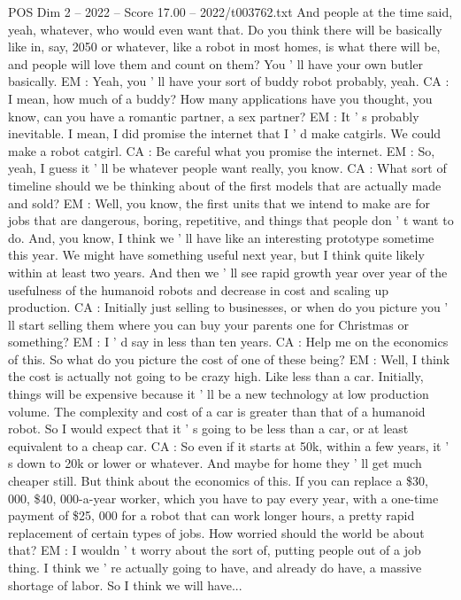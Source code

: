 \begin{textsample}{POS Dim 2 – 2022 – Score 17.00 – 2022/t003762.txt}
And people at the time said, yeah, whatever, who would even want that.
Do you think there will be basically like in, say, 2050 or whatever, like a robot in most homes, is what there will be, and people will love them and count on them?
You ' ll have your own butler basically.
EM : Yeah, you ' ll have your sort of buddy robot probably, yeah.
CA : I mean, how much of a buddy?
How many applications have you thought, you know, can you have a romantic partner, a sex partner?
EM : It ' s probably inevitable.
I mean, I did promise the internet that I ' d make catgirls.
We could make a robot catgirl.
CA : Be careful what you promise the internet.
EM : So, yeah, I guess it ' ll be whatever people want really, you know.
CA : What sort of timeline should we be thinking about of the first models that are actually made and sold?
EM : Well, you know, the first units that we intend to make are for jobs that are dangerous, boring, repetitive, and things that people don ' t want to do.
And, you know, I think we ' ll have like an interesting prototype sometime this year.
We might have something useful next year, but I think quite likely within at least two years.
And then we ' ll see rapid growth year over year of the usefulness of the humanoid robots and decrease in cost and scaling up production.
CA : Initially just selling to businesses, or when do you picture you ' ll start selling them where you can buy your parents one for Christmas or something?
EM : I ' d say in less than ten years.
CA : Help me on the economics of this.
So what do you picture the cost of one of these being?
EM : Well, I think the cost is actually not going to be crazy high.
Like less than a car.
Initially, things will be expensive because it ' ll be a new technology at low production volume.
The complexity and cost of a car is greater than that of a humanoid robot.
So I would expect that it ' s going to be less than a car, or at least equivalent to a cheap car.
CA : So even if it starts at 50k, within a few years, it ' s down to 20k or lower or whatever.
And maybe for home they ' ll get much cheaper still.
But think about the economics of this.
If you can replace a \$30, 000, \$40, 000-a-year worker, which you have to pay every year, with a one-time payment of \$25, 000 for a robot that can work longer hours, a pretty rapid replacement of certain types of jobs.
How worried should the world be about that?
EM : I wouldn ' t worry about the sort of, putting people out of a job thing.
I think we ' re actually going to have, and already do have, a massive shortage of labor.
So I think we will have...

\end{textsample}
